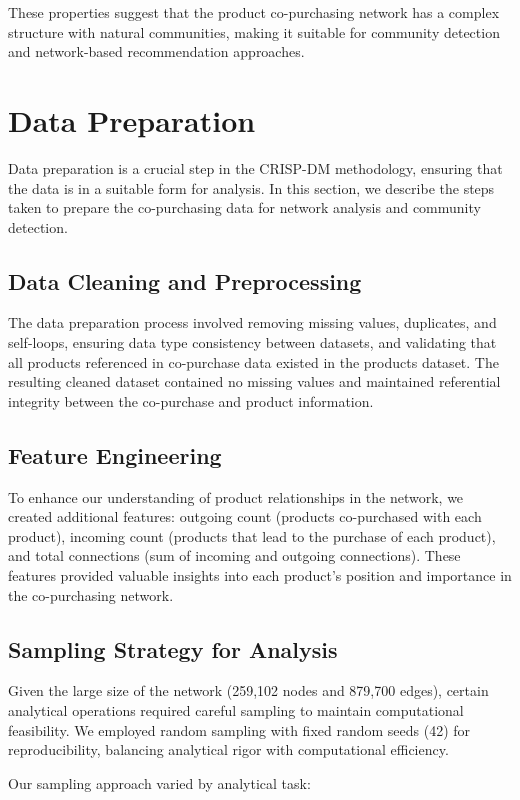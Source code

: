 \documentclass[conference]{IEEEtran}
\begin{document}
These properties suggest that the product co-purchasing network has a complex structure with natural communities, making it suitable for community detection and network-based recommendation approaches.

\section{Data Preparation}
Data preparation is a crucial step in the CRISP-DM methodology, ensuring that the data is in a suitable form for analysis. In this section, we describe the steps taken to prepare the co-purchasing data for network analysis and community detection.

\subsection{Data Cleaning and Preprocessing}
The data preparation process involved removing missing values, duplicates, and self-loops, ensuring data type consistency between datasets, and validating that all products referenced in co-purchase data existed in the products dataset. The resulting cleaned dataset contained no missing values and maintained referential integrity between the co-purchase and product information.

\subsection{Feature Engineering}
To enhance our understanding of product relationships in the network, we created additional features: outgoing count (products co-purchased with each product), incoming count (products that lead to the purchase of each product), and total connections (sum of incoming and outgoing connections). These features provided valuable insights into each product's position and importance in the co-purchasing network.

\subsection{Sampling Strategy for Analysis}
\label{sec:sampling}
Given the large size of the network (259,102 nodes and 879,700 edges), certain analytical operations required careful sampling to maintain computational feasibility. We employed random sampling with fixed random seeds (42) for reproducibility, balancing analytical rigor with computational efficiency.

Our sampling approach varied by analytical task:
\end{document}
